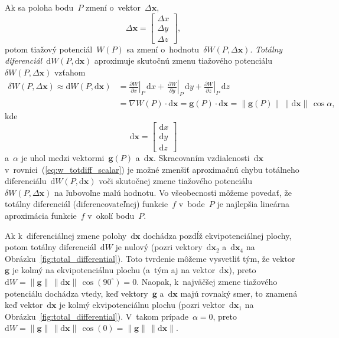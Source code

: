 \documentclass[a4paper,12pt]{book}
\newcommand{\diff}{\mathrm d}
\let\vec\mathbf
\begin{document}
Ak sa poloha bodu~$P$ zmení o~vektor~$\Delta \vec x$,
%
\begin{equation}
\label{eq:deltax}
\Delta \vec x =
\begin{bmatrix}
\Delta x\\
\Delta y\\
\Delta z
\end{bmatrix}
{,}
\end{equation}
%
potom tiažový potenciál~$W(P)$ sa zmení o~hodnotu~$\delta W(P, \Delta \vec x)$.  
\emph{Totálny diferenciál}~$\diff W(P, \diff \vec x)$ aproximuje skutočnú zmenu 
tiažového potenciálu~$\delta W(P, \Delta \vec x)$ vzťahom
%
\begin{equation}
\label{eq:w_totdiff_scalar}
\begin{split}
\delta W(P, \Delta \vec x) \approx \diff W(P, \diff \vec x) &= 
\left.\frac{\partial W}{\partial x}\right|_P \, \diff x + \, 
\left.\frac{\partial W}{\partial y}\right|_P \, \diff y + \left.\frac{\partial 
W}{\partial z}\right|_P \, \diff z\\
%
&= \nabla W(P) \cdot \diff \vec x = \vec g(P) \cdot \diff \vec x = \| \vec g(P) 
\| \, \| \diff \vec x \| \, \cos\alpha{,}
\end{split}
\end{equation}
%
kde
%
\begin{equation}
\label{eq:diffx}
\diff \vec x =
\begin{bmatrix}
\diff x\\
\diff y\\
\diff z
\end{bmatrix}
\end{equation}
%
a~$\alpha$ je uhol medzi vektormi~$\vec g(P)$ a~$\diff \vec x$.  Skracovaním 
vzdialenosti~$\diff \vec x$ v~rovnici~(\ref{eq:w_totdiff_scalar}) je možné 
zmenšiť aproximačnú chybu totálneho diferenciálu~$\diff W(P, \diff \vec x)$ 
voči skutočnej zmene tiažového potenciálu~$\delta W(P, \Delta \vec x)$ na 
ľubovoľne malú hodnotu.  Vo všeobecnosti môžeme povedať, že totálny diferenciál 
(diferencovateľnej) funkcie~$f$ v~bode~$P$ je najlepšia lineárna aproximácia 
funkcie~$f$ v~okolí bodu~$P$.

Ak k~diferenciálnej zmene polohy~$\diff \vec x$ dochádza pozdĺž 
ekvipotenciálnej plochy, potom totálny diferenciál~$\diff W$ je nulový (pozri 
vektory~$\diff \vec x_2$ a~$\diff \vec x_4$ na 
Obrázku~\ref{fig:total_differential}).  Toto tvrdenie môžeme vysvetliť tým, že 
vektor~$\vec g$ je kolmý na ekvipotenciálnu plochu (a~tým aj na vektor~$\diff 
\vec x$), preto $\diff W = \| \vec g \| \, \| \diff \vec x \| \, 
\cos(90^{\circ}) = 0$.  Naopak, k~najväčšej zmene tiažového potenciálu dochádza 
vtedy, keď vektory~$\vec g$ a~$\diff \vec x$ majú rovnaký smer, to znamená keď 
vektor~$\diff \vec x$ je kolmý ekvipotenciálnu plochu (pozri vektor~$\diff \vec 
x_1$ na Obrázku~\ref{fig:total_differential}).  V~takom prípade~$\alpha = 0$, 
preto $\diff W = \| \vec g \| \, \| \diff \vec x \| \, \cos(0) = \| \vec g \| 
\, \| \diff \vec x \|$.
\end{document}
